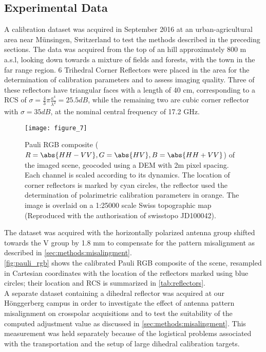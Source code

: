 \subsection{Experimental Data}\label{sec:methods:data}
A calibration dataset was acquired in September 2016 at an urban-agricultural area near M\"{u}nsingen, Switzerland to test the methods described in the preceding sections. The data was acquired from the top of an hill approximately 800 m a.s.l, looking down towards a mixture of fields and forests, with the town in the far range region. 6 Trihedral Corner Reflectors were placed in the area for the determination of calibration parameters and to assess imaging quality. Three of these reflectors have triangular faces with a length of 40 cm, corresponding to a RCS of $\sigma=\frac{4}{3}\pi \frac{a^4}{\lambda^2}=25.5 dB$, while the remaining two are cubic corner reflector with $\sigma= 35 dB$, at the nominal central frequency of 17.2 GHz.
	\begin{figure*}
		\centering
		\texttt{[image: figure\_7]}
		\caption{Pauli RGB composite ($R=\abs{HH-VV},G=\abs{HV},B=\abs{HH+VV}$) of the imaged scene, geocoded using a DEM with 2m pixel spacing. Each channel is scaled according to its dynamics. The location of corner reflectors is marked by cyan circles, the reflector used the determination of polarimetric calibration parameters in orange. The image is overlaid on a 1:25000 scale Swiss topographic map (Reproduced with the authorisation of swisstopo  JD100042).}
		\label{fig:pauli_rgb}
	\end{figure*}
The dataset was acquired with the horizontally polarized antenna group shifted towards the V group by 1.8 mm to compensate for the pattern misalignment as described in \autoref{sec:methods:misalingment}.\\
\autoref{fig:pauli_rgb} shows the calibrated Pauli RGB composite of the scene, resampled in Cartesian coordinates with the location of the reflectors marked using blue circles; their location and RCS is summarized in \autoref{tab:reflectors}.\\
A separate dataset containing a dihedral reflector was acquired at our H\"{o}nggerberg campus in order to investigate the effect of antenna pattern misalignment on crosspolar acquisitions and to test the suitability of the computed adjustment value as discussed in \autoref{sec:methods:misalingment}. This measurement was held separately because of the logistical problems associated with the transportation and the setup of large dihedral calibration targets.

